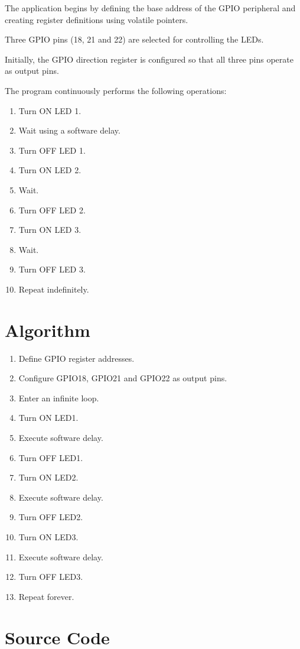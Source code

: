 \documentclass[12pt]{article}
\begin{document}
The application begins by defining the base address of the GPIO peripheral and creating register definitions using volatile pointers.

Three GPIO pins (18, 21 and 22) are selected for controlling the LEDs.

Initially, the GPIO direction register is configured so that all three pins operate as output pins.

The program continuously performs the following operations:

\begin{enumerate}
\item Turn ON LED 1.
\item Wait using a software delay.
\item Turn OFF LED 1.
\item Turn ON LED 2.
\item Wait.
\item Turn OFF LED 2.
\item Turn ON LED 3.
\item Wait.
\item Turn OFF LED 3.
\item Repeat indefinitely.
\end{enumerate}

\section{Algorithm}

\begin{enumerate}
\item Define GPIO register addresses.
\item Configure GPIO18, GPIO21 and GPIO22 as output pins.
\item Enter an infinite loop.
\item Turn ON LED1.
\item Execute software delay.
\item Turn OFF LED1.
\item Turn ON LED2.
\item Execute software delay.
\item Turn OFF LED2.
\item Turn ON LED3.
\item Execute software delay.
\item Turn OFF LED3.
\item Repeat forever.
\end{enumerate}

\section{Source Code}
\end{document}
